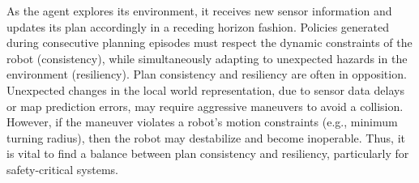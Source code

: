 \documentclass[letterpaper]{article} %
\begin{document}
\noindent
As the agent explores its environment, it receives new sensor information and updates its plan accordingly in a receding horizon fashion. %
Policies generated during consecutive planning episodes must respect the dynamic constraints of the robot (consistency), while simultaneously adapting to unexpected hazards in the environment (resiliency). Plan consistency and resiliency are often in opposition. Unexpected changes in the local world representation, due to sensor data delays or map prediction errors, may require aggressive maneuvers to avoid a collision. However, if the maneuver violates a robot's motion constraints (e.g., minimum turning radius), then the robot may destabilize and become inoperable. Thus, it is vital to find a balance between plan consistency and resiliency, particularly for safety-critical systems.





\end{document}
